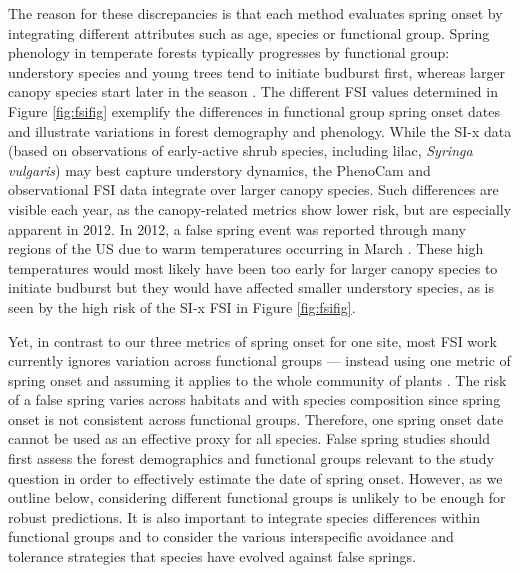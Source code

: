 \documentclass{article}\usepackage[]{graphicx}\usepackage[]{color}
\begin{document}
The reason for these discrepancies is that each method evaluates spring onset by integrating different attributes such as age, species or functional group. Spring phenology in temperate forests typically progresses by functional group: understory species and young trees tend to initiate budburst first, whereas larger canopy species start later in the season \citep{Richardson2009, Xin2016}. The different FSI values determined in Figure \ref{fig:fsifig} exemplify the differences in functional group spring onset dates and illustrate variations in forest demography and phenology. While the SI-x data (based on observations of early-active shrub species, including lilac, \emph{Syringa vulgaris}) may best capture understory dynamics, the PhenoCam and observational FSI data integrate over larger canopy species. Such differences are visible each year, as the canopy-related metrics show lower risk, but are especially apparent in 2012. In 2012, a false spring event was reported through many regions of the US due to warm temperatures occurring in March \citep{Ault2015}. These high temperatures would most likely have been too early for larger canopy species to initiate budburst but they would have affected smaller understory species, as is seen by the high risk of the SI-x FSI in Figure \ref{fig:fsifig}. 

Yet, in contrast to our three metrics of spring onset for one site, most FSI work currently ignores variation across functional groups --- instead using one metric of spring onset and assuming it applies to the whole community of plants \citep{Marino2011, Peterson2014, Allstadt2015, Mehdipoor2017}. The risk of a false spring varies across habitats and with species composition since spring onset is not consistent across functional groups. Therefore, one spring onset date cannot be used as an effective proxy for all species. False spring studies should first assess the forest demographics and functional groups relevant to the study question in order to effectively estimate the date of spring onset. However, as we outline below, considering different functional groups is unlikely to be enough for robust predictions. It is also important to integrate species differences within functional groups and to consider the various interspecific avoidance and tolerance strategies that species have evolved against false springs. 
\end{document}
